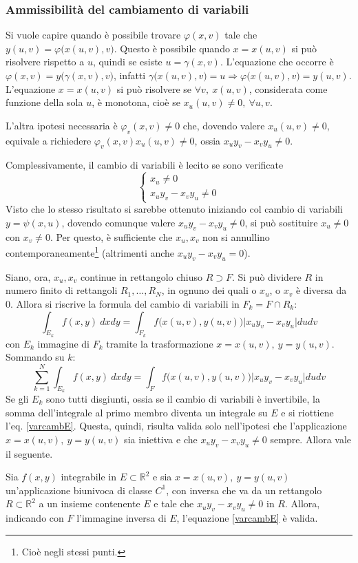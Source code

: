 \documentclass[11pt, a4paper]{scrartcl}
\theoremstyle{definition}
\numberwithin{esempio}{section}
\theoremstyle{definition}
\numberwithin{obs}{section}
\numberwithin{nota}{section}
\numberwithin{equation}{subsection}
\begin{document}
\subsubsection{Ammissibilit\`a del cambiamento di variabili}
Si vuole capire quando \`e possibile trovare $\varphi (x,v)$ tale che $y(u,v) = \varphi \big(x(u,v) , v\big)$. 
Questo \`e possibile quando $x=x(u,v)$ si pu\`o risolvere rispetto a $u$, quindi se esiste $u=\gamma(x,v)$.
L'equazione che occorre \`e $\varphi (x,v) = y\big(\gamma(x,v),v\big)$, infatti $\gamma\big(x(u,v) , v\big)= u\Rightarrow \varphi \big(x(u,v),v\big)=y(u,v)$.
L'equazione $x=x(u,v)$ si pu\`o risolvere se $\forall v, \ x(u,v)$, considerata come funzione della sola $u$, \`e monotona, cio\`e se $x_u(u,v) \neq 0, \ \forall u,v$.

L'altra ipotesi necessaria \`e $\varphi _v(x,v)\neq 0$ che, dovendo valere $x_u(u,v) \neq 0 $, equivale a richiedere $\varphi _v(x,v) x_u(u,v) \neq 0$, ossia $x_uy_v - x_v y_u \neq 0 $.

Complessivamente, il cambio di variabili \`e lecito se sono verificate
\begin{equation}
	\begin{cases}
		x_u \neq 0 \\
		x_uy_v - x_v y_u \neq 0 
	\end{cases}
\end{equation}
Visto che lo stesso risultato si sarebbe ottenuto iniziando col cambio di variabili $y = \psi (x,u)$, dovendo comunque valere $x_uy_v - x_v y_u \neq 0$, si pu\`o sostituire $x_u\neq 0 $ con $x_v \neq 0$. Per questo, \`e sufficiente che $x_u,x_v$ non si annullino contemporaneamente\footnote{Cio\`e negli stessi punti.} (altrimenti anche $x_uy_v - x_vy_u = 0$).

Siano, ora, $x_u, x_v$ continue in rettangolo chiuso $R\supset F$. 
Si pu\`o dividere $R$ in numero finito di rettangoli $R_1,\ldots, R_N$, in ognuno dei quali o $x_u$, o $x_v$ \`e diversa da $0$. 
Allora si riscrive la formula del cambio di variabili in $F_k = F \cap R_k$:
\[
\int_{E_k} f(x,y) \ dxdy = \int_{F_k}  f\big(x(u,v) , y(u,v)\big) \lvert x_u y_v - x_vy_u \rvert dudv
\] 
con $E_k$ immagine di $F_k$ tramite la trasformazione $x = x(u,v),\ y = y(u,v)$. Sommando su $k$:
\[
\sum_{k=1}^{N}\int_{E_k} f(x,y) \ dxdy = \int_{F}  f\big(x(u,v) , y(u,v)\big) \lvert x_u y_v - x_vy_u \rvert dudv
\] 
Se gli $E_k$ sono tutti disgiunti, ossia se il cambio di variabili \`e invertibile, la somma dell'integrale al primo membro diventa un integrale su $E$ e si riottiene l'eq. \ref{varcambE}.
Questa, quindi, risulta valida solo nell'ipotesi che l'applicazione $x=x(u,v), \ y=y(u,v)$ sia iniettiva e che $x_uy_v-x_vy_u \neq 0$ sempre. 
Allora vale il seguente.
\begin{teorema}
	{}{}
	Sia $f(x,y)$ integrabile in $E \subset \mathbb{R}^2$ e sia $x=x(u,v), \ y=y(u,v)$ un'applicazione biunivoca di classe $C^1$, con inversa che va da un rettangolo $R\subset \mathbb{R}^2$ a un insieme contenente $E$ e tale che $x_uy_v - x_vy_u \neq 0 $ in $R$. Allora, indicando con $F$ l'immagine inversa di $E$, l'equazione \ref{varcambE} \`e valida.
	
\end{teorema}
\end{document}
